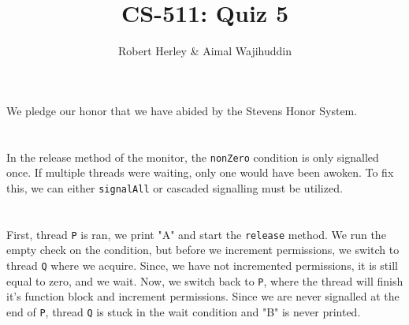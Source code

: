 \documentclass{article}
\begin{document}
\renewcommand{\thesection}{Exercise \arabic{section}}

\title{CS-511: Quiz 5}
\author{Robert Herley \& Aimal Wajihuddin}

\maketitle

\begin{center}
   We pledge our honor that we have abided by the Stevens Honor System.
\end{center}

\section{}
In the release method of the monitor, the \texttt{nonZero} condition is only
signalled once. If multiple threads were waiting, only one would have been 
awoken. To fix this, we can either \texttt{signalAll} or cascaded signalling
must be utilized.

\section{}
First, thread \texttt{P} is ran, we print "A" and start the \texttt{release} method.
We run the empty check on the condition, but before we increment permissions, we
switch to thread \texttt{Q} where we acquire. Since, we have not incremented 
permissions, it is still equal to zero, and we wait. Now, we switch back to 
\texttt{P}, where the thread will finish it's function block and increment
permissions. Since we are never signalled at the end of \texttt{P}, thread 
\texttt{Q} is stuck in the wait condition and "B" is never printed.
\end{document}

